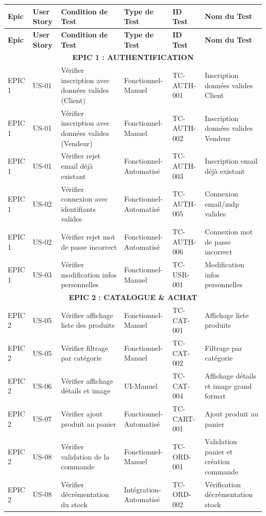 \documentclass[12pt,a4paper]{article}
\begin{document}
\begin{longtable}{|p{2.5cm}|p{2cm}|p{3cm}|p{2cm}|p{1.5cm}|p{2.5cm}|}
    \hline
    \textbf{Epic} & \textbf{User Story} & \textbf{Condition de Test} & \textbf{Type de Test} & \textbf{ID Test} & \textbf{Nom du Test} \\ \hline
    \endfirsthead
    \hline
    \textbf{Epic} & \textbf{User Story} & \textbf{Condition de Test} & \textbf{Type de Test} & \textbf{ID Test} & \textbf{Nom du Test} \\ \hline
    \endhead
    
    \multicolumn{6}{|c|}{\textbf{EPIC 1 : AUTHENTIFICATION}} \\ \hline
    
    EPIC 1 & US-01 & Vérifier inscription avec données valides (Client) & Fonctionnel-Manuel & TC-AUTH-001 & Inscription données valides Client \\ \hline
    EPIC 1 & US-01 & Vérifier inscription avec données valides (Vendeur) & Fonctionnel-Manuel & TC-AUTH-002 & Inscription données valides Vendeur \\ \hline
    EPIC 1 & US-01 & Vérifier rejet email déjà existant & Fonctionnel-Automatisé & TC-AUTH-003 & Inscription email déjà existant \\ \hline
    EPIC 1 & US-02 & Vérifier connexion avec identifiants valides & Fonctionnel-Automatisé & TC-AUTH-005 & Connexion email/mdp valides \\ \hline
    EPIC 1 & US-02 & Vérifier rejet mot de passe incorrect & Fonctionnel-Automatisé & TC-AUTH-006 & Connexion mot de passe incorrect \\ \hline
    EPIC 1 & US-03 & Vérifier modification infos personnelles & Fonctionnel-Manuel & TC-USR-001 & Modification infos personnelles \\ \hline
    
    \multicolumn{6}{|c|}{\textbf{EPIC 2 : CATALOGUE \& ACHAT}} \\ \hline
    
    EPIC 2 & US-05 & Vérifier affichage liste des produits & Fonctionnel-Manuel & TC-CAT-001 & Affichage liste produits \\ \hline
    EPIC 2 & US-05 & Vérifier filtrage par catégorie & Fonctionnel-Manuel & TC-CAT-002 & Filtrage par catégorie \\ \hline
    EPIC 2 & US-06 & Vérifier affichage détails et image & UI-Manuel & TC-CAT-004 & Affichage détails et image grand format \\ \hline
    EPIC 2 & US-07 & Vérifier ajout produit au panier & Fonctionnel-Automatisé & TC-CART-001 & Ajout produit au panier \\ \hline
    EPIC 2 & US-08 & Vérifier validation de la commande & Fonctionnel-Manuel & TC-ORD-001 & Validation panier et création commande \\ \hline
    EPIC 2 & US-08 & Vérifier décrémentation du stock & Intégration-Automatisé & TC-ORD-002 & Vérification décrémentation stock \\ \hline
    

\end{longtable}
\end{document}
